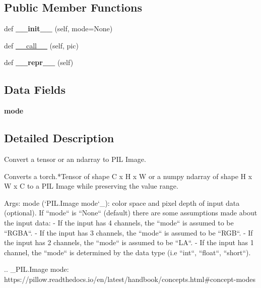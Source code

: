 \subsection*{Public Member Functions}
\begin{DoxyCompactItemize}
\item 
\mbox{\label{classtorchvision_1_1transforms_1_1transforms_1_1ToPILImage_aa805763fecb44db7714ec935df1f9f02}} 
def {\bfseries \+\_\+\+\_\+init\+\_\+\+\_\+} (self, mode=None)
\item 
def \hyperlink{classtorchvision_1_1transforms_1_1transforms_1_1ToPILImage_a14627896935e3847a17bc058c8b8ed91}{\+\_\+\+\_\+call\+\_\+\+\_\+} (self, pic)
\item 
\mbox{\label{classtorchvision_1_1transforms_1_1transforms_1_1ToPILImage_a3ba601fed2ebb3f64840cb2914a3058a}} 
def {\bfseries \+\_\+\+\_\+repr\+\_\+\+\_\+} (self)
\end{DoxyCompactItemize}
\subsection*{Data Fields}
\begin{DoxyCompactItemize}
\item 
\mbox{\label{classtorchvision_1_1transforms_1_1transforms_1_1ToPILImage_ab4a0e76883557af38d65110170e43786}} 
{\bfseries mode}
\end{DoxyCompactItemize}


\subsection{Detailed Description}
\begin{DoxyVerb}Convert a tensor or an ndarray to PIL Image.

Converts a torch.*Tensor of shape C x H x W or a numpy ndarray of shape
H x W x C to a PIL Image while preserving the value range.

Args:
    mode (`PIL.Image mode`_): color space and pixel depth of input data (optional).
        If ``mode`` is ``None`` (default) there are some assumptions made about the input data:
         - If the input has 4 channels, the ``mode`` is assumed to be ``RGBA``.
         - If the input has 3 channels, the ``mode`` is assumed to be ``RGB``.
         - If the input has 2 channels, the ``mode`` is assumed to be ``LA``.
         - If the input has 1 channel, the ``mode`` is determined by the data type (i.e ``int``, ``float``,
           ``short``).

.. _PIL.Image mode: https://pillow.readthedocs.io/en/latest/handbook/concepts.html#concept-modes
\end{DoxyVerb}
 

